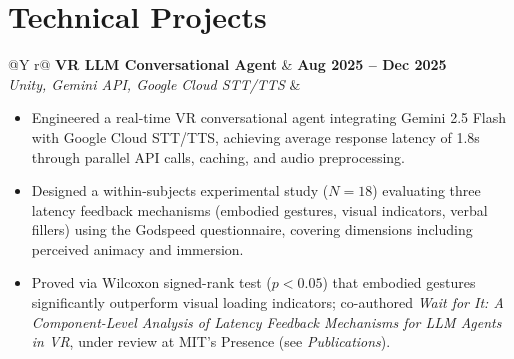 \documentclass[11pt,letterpaper]{article}
\makeatletter
\newcommand{\cventry}[4]{%
    \begin{tabularx}{\linewidth}{@{}Y r@{}}
        \textbf{#1} & \textbf{\footnotesize #2} \\
        \textit{\footnotesize #3} & \textit{\footnotesize #4} \\
    \end{tabularx}%
    \vspace{0.3ex}
}
\makeatother
\begin{document}
%
 
\section*{Technical Projects}
\vspace{-0.5ex}
 
\cventry{VR LLM Conversational Agent}{Aug 2025 -- Dec 2025}{Unity, Gemini API, Google Cloud STT/TTS}{}
\begin{itemize}
    \item Engineered a real-time VR conversational agent integrating Gemini 2.5 Flash with Google Cloud STT/TTS, achieving average response latency of 1.8s through parallel API calls, caching, and audio preprocessing.
    \item Designed a within-subjects experimental study ($N=18$) evaluating three latency feedback mechanisms (embodied gestures, visual indicators, verbal fillers) using the Godspeed questionnaire, covering dimensions including perceived animacy and immersion.
    \item Proved via Wilcoxon signed-rank test ($p<0.05$) that embodied gestures significantly outperform visual loading indicators; co-authored \textit{Wait for It: A Component-Level Analysis of Latency Feedback Mechanisms for LLM Agents in VR}, under review at MIT's Presence (see \textit{Publications}).
\end{itemize}
 
\end{document}
